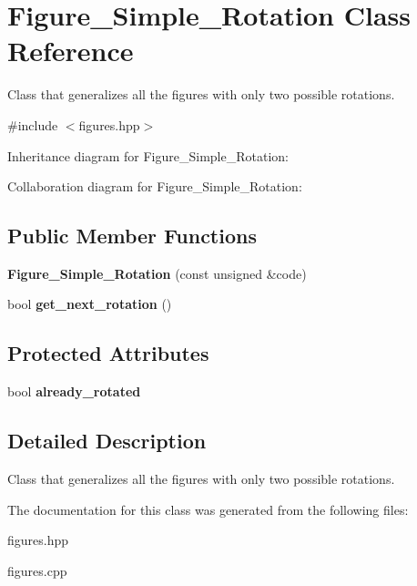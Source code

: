 \hypertarget{classFigure__Simple__Rotation}{}\section{Figure\+\_\+\+Simple\+\_\+\+Rotation Class Reference}
\label{classFigure__Simple__Rotation}


Class that generalizes all the figures with only two possible rotations.  




{\ttfamily \#include $<$figures.\+hpp$>$}



Inheritance diagram for Figure\+\_\+\+Simple\+\_\+\+Rotation\+:


Collaboration diagram for Figure\+\_\+\+Simple\+\_\+\+Rotation\+:
\subsection*{Public Member Functions}
\begin{DoxyCompactItemize}
\item 
\mbox{\label{classFigure__Simple__Rotation_a97aafee81566f21514b924b7cbbab9c4}} 
{\bfseries Figure\+\_\+\+Simple\+\_\+\+Rotation} (const unsigned \&code)
\item 
\mbox{\label{classFigure__Simple__Rotation_a612c08d0230dae7553fcd91310938ca1}} 
bool {\bfseries get\+\_\+next\+\_\+rotation} ()
\end{DoxyCompactItemize}
\subsection*{Protected Attributes}
\begin{DoxyCompactItemize}
\item 
\mbox{\label{classFigure__Simple__Rotation_a5ca8b8d6dd7768c6b95e5a782cdc95fd}} 
bool {\bfseries already\+\_\+rotated}
\end{DoxyCompactItemize}


\subsection{Detailed Description}
Class that generalizes all the figures with only two possible rotations. 

The documentation for this class was generated from the following files\+:\begin{DoxyCompactItemize}
\item 
figures.\+hpp\item 
figures.\+cpp\end{DoxyCompactItemize}
